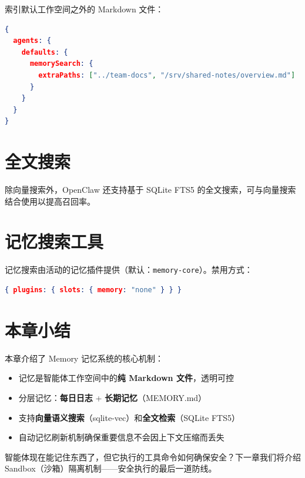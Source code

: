 索引默认工作空间之外的 Markdown 文件：

\begin{lstlisting}[language=json]
{
  agents: {
    defaults: {
      memorySearch: {
        extraPaths: ["../team-docs", "/srv/shared-notes/overview.md"]
      }
    }
  }
}
\end{lstlisting}

\section{全文搜索}

除向量搜索外，OpenClaw 还支持基于 SQLite FTS5 的全文搜索，可与向量搜索结合使用以提高召回率。

\section{记忆搜索工具}

记忆搜索由活动的记忆插件提供（默认：\texttt{memory-core}）。禁用方式：

\begin{lstlisting}[language=json]
{ plugins: { slots: { memory: "none" } } }
\end{lstlisting}

\section{本章小结}

本章介绍了 Memory 记忆系统的核心机制：

\begin{itemize}
  \item 记忆是智能体工作空间中的\textbf{纯 Markdown 文件}，透明可控
  \item 分层记忆：\textbf{每日日志} + \textbf{长期记忆}（MEMORY.md）
  \item 支持\textbf{向量语义搜索}（sqlite-vec）和\textbf{全文检索}（SQLite FTS5）
  \item 自动记忆刷新机制确保重要信息不会因上下文压缩而丢失
\end{itemize}

\noindent 智能体现在能记住东西了，但它执行的工具命令如何确保安全？下一章我们将介绍 Sandbox（沙箱）隔离机制——安全执行的最后一道防线。
